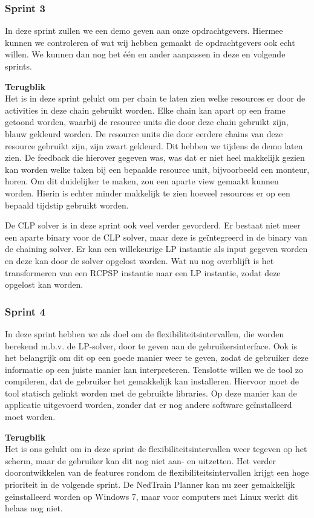 \subsubsection{Sprint 3}
In deze sprint zullen we een demo geven aan onze opdrachtgevers. Hiermee kunnen we controleren of wat wij hebben gemaakt de opdrachtgevers ook echt willen. We kunnen dan nog het \'e\'en en ander aanpassen in deze en volgende sprints.

\textbf{Terugblik} \\
Het is in deze sprint gelukt om per chain te laten zien welke resources er door de activities in deze chain gebruikt worden. Elke chain kan apart op een frame getoond worden, waarbij de resource units die door deze chain gebruikt zijn, blauw gekleurd worden. De resource units die door eerdere chains van deze resource gebruikt zijn, zijn zwart gekleurd. Dit hebben we tijdens de demo laten zien. De feedback die hierover gegeven was, was dat er niet heel makkelijk gezien kan worden welke taken bij een bepaalde resource unit, bijvoorbeeld een monteur, horen. Om dit duidelijker te maken, zou een aparte view gemaakt kunnen worden. Hierin is echter minder makkelijk te zien hoeveel resources er op een bepaald tijdstip gebruikt worden.

De CLP solver is in deze sprint ook veel verder gevorderd. Er bestaat niet meer een aparte binary voor de CLP solver, maar deze is ge\"integreerd in de binary van de chaining solver. Er kan een willekeurige LP instantie als input gegeven worden en deze kan door de solver opgelost worden. Wat nu nog overblijft is het transformeren van een RCPSP instantie naar een LP instantie, zodat deze opgelost kan worden.

\subsubsection{Sprint 4}
In deze sprint hebben we als doel om de flexibiliteitsintervallen, die worden berekend m.b.v. de LP-solver, door te geven aan de gebruikersinterface. Ook is het belangrijk om dit op een goede manier weer te geven, zodat de gebruiker deze informatie op een juiste manier kan interpreteren. Tenslotte willen we de tool zo compileren, dat de gebruiker het gemakkelijk kan installeren. Hiervoor moet de tool statisch gelinkt worden met de gebruikte libraries. Op deze manier kan de applicatie uitgevoerd worden, zonder dat er nog andere software ge\"installeerd moet worden.

\textbf{Terugblik} \\
Het is ons gelukt om in deze sprint de flexibiliteitsintervallen weer tegeven op het scherm, maar de gebruiker kan dit nog niet aan- en uitzetten. Het verder doorontwikkelen van de features rondom de flexibiliteitsintervallen krijgt een hoge prioriteit in de volgende sprint. De NedTrain Planner kan nu zeer gemakkelijk ge\"installeerd worden op Windows 7, maar voor computers met Linux werkt dit helaas nog niet. 

